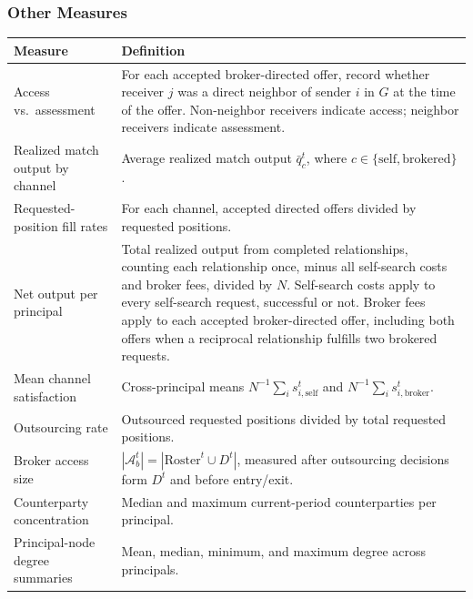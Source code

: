 \documentclass[11pt]{article}
\begin{document}
\subsubsection{Other Measures}\label{other-measures}

{
\begin{longtable}[]{@{}
  >{\raggedright\arraybackslash}p{}
  >{\raggedright\arraybackslash}p{}@{}}
\toprule\noalign{}
\begin{minipage}[b]{\linewidth}\raggedright
Measure
\end{minipage} & \begin{minipage}[b]{\linewidth}\raggedright
Definition
\end{minipage} \\
\midrule\noalign{}
\endhead
\bottomrule\noalign{}
\endlastfoot
Access vs.~assessment & For each accepted broker-directed offer, record whether receiver \(j\) was a direct neighbor of sender \(i\) in \(G\) at the time of the offer. Non-neighbor receivers indicate access; neighbor receivers indicate assessment. \\
Realized match output by channel & Average realized match output \(\bar{q}_c^t\), where \(c \in \{\text{self}, \text{brokered}\}\). \\
Requested-position fill rates & For each channel, accepted directed offers divided by requested positions. \\
Net output per principal & Total realized output from completed relationships, counting each relationship once, minus all self-search costs and broker fees, divided by \(N\). Self-search costs apply to every self-search request, successful or not. Broker fees apply to each accepted broker-directed offer, including both offers when a reciprocal relationship fulfills two brokered requests. \\
Mean channel satisfaction & Cross-principal means \(N^{-1}\sum_i s_{i,\text{self}}^t\) and \(N^{-1}\sum_i s_{i,\text{broker}}^t\). \\
Outsourcing rate & Outsourced requested positions divided by total requested positions. \\
Broker access size & \(|\mathcal{A}_b^t| = |\text{Roster}^t \cup D^t|\), measured after outsourcing decisions form \(D^t\) and before entry/exit. \\
Counterparty concentration & Median and maximum current-period counterparties per principal. \\
Principal-node degree summaries & Mean, median, minimum, and maximum degree across principals. \\
\end{longtable}
}
\end{document}

